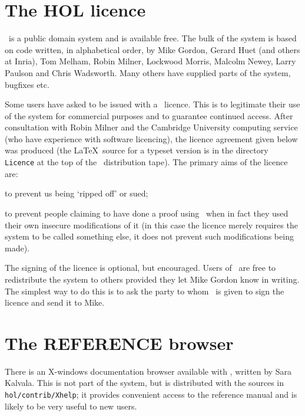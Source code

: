 {\section{The HOL licence}

\HOL\ is a public domain system and is available free. The bulk of the system
is based on code written, in alphabetical order, by Mike Gordon,
Gerard Huet (and others at Inria), Tom Melham, Robin Milner, Lockwood
Morris, Malcolm Newey, Larry Paulson and Chris Wadsworth. Many others
have supplied parts of the system, bugfixes etc.

Some users have asked to be issued with a \HOL\ licence.  This is to
legitimate their use of the system for commercial purposes and to
guarantee continued access.  After consultation with Robin Milner and
the Cambridge University computing service (who have experience with
software licencing), the licence agreement given below was produced
(the \LaTeX\ source for a typeset version is in the directory {\tt
Licence} at the top of the \HOL\ distribution tape).  The primary aims
of the licence are:

\begin{myenumerate}
\item to prevent us being `ripped off' or sued;
\item to prevent people claiming to have done a proof using \HOL\ when
in fact they used their own insecure modifications of it
(in this case the licence merely requires the system to be called
something else, it does not prevent such modifications being made).
\end{myenumerate}

The signing of the licence is optional, but encouraged. Users of \HOL\ are
free to redistribute the system to others provided they let Mike Gordon know
in writing. The simplest way to do this is to ask the party to whom \HOL\ is
given to sign the licence and send it to Mike.

\section{The REFERENCE browser}

There is an X-windows documentation browser available with \HOL, written by
Sara Kalvala.  This is not part of the \HOL{} system,
but is distributed with the sources in {\small\verb+hol/contrib/Xhelp+}; it
provides convenient access to the reference manual \REFERENCE{} and is
likely to be very useful to new users.


\newpage

}
